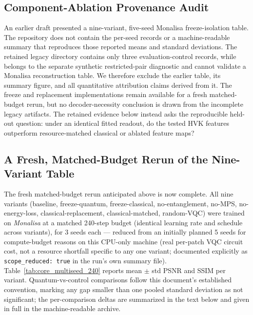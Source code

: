 \documentclass[11pt]{article}
\begin{document}
\subsection{Component-Ablation Provenance Audit}
\label{sec:component_provenance}
\begin{sloppypar}
An earlier draft presented a nine-variant, five-seed Monalisa freeze-isolation table. The repository does not contain the per-seed records or a machine-readable summary that reproduces those reported means and standard deviations. The retained legacy directory contains only three evaluation-control records, while  belongs to the separate synthetic restricted-pair diagnostic and cannot validate a Monalisa reconstruction table. We therefore exclude the earlier table, its summary figure, and all quantitative attribution claims derived from it. The freeze and replacement implementations remain available for a fresh matched-budget rerun, but no decoder-necessity conclusion is drawn from the incomplete legacy artifacts. The retained evidence below instead asks the reproducible held-out question: under an identical fitted readout, do the tested HVK features outperform resource-matched classical or ablated feature maps?
\end{sloppypar}

\subsection{A Fresh, Matched-Budget Rerun of the Nine-Variant Table}
\label{sec:core_multiseed_rerun}
The fresh matched-budget rerun anticipated above is now complete. All nine variants (baseline, freeze-quantum, freeze-classical, no-entanglement, no-MPS, no-energy-loss, classical-replacement, classical-matched, random-VQC) were trained on \textit{Monalisa} at a matched 240-step budget (identical learning rate and schedule across variants), for 3 seeds each --- reduced from an initially planned 5 seeds for compute-budget reasons on this CPU-only machine (real per-patch VQC circuit cost, not a resource shortfall specific to any one variant; documented explicitly as \texttt{scope\_reduced: true} in the run's own summary file). Table~\ref{tab:core_multiseed_240} reports mean $\pm$ std PSNR and SSIM per variant. Quantum-vs-control comparisons follow this document's established convention, marking any gap smaller than one pooled standard deviation as not significant; the per-comparison deltas are summarized in the text below and given in full in the machine-readable archive.
\end{document}
